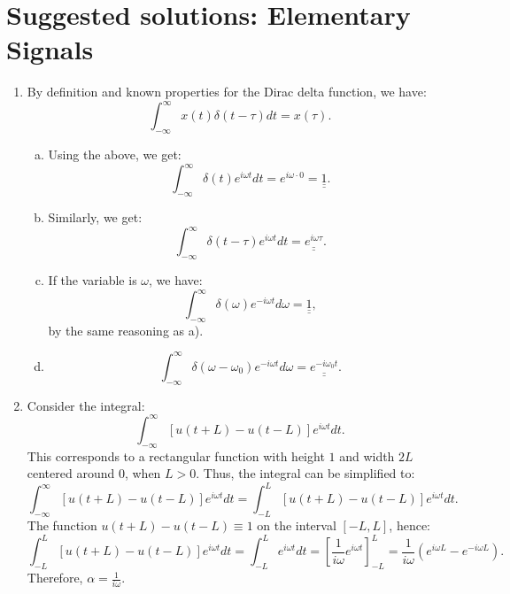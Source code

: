 
\newpage
\section{Suggested solutions: Elementary Signals}

\begin{enumerate}
  \item By definition and known properties for the Dirac delta function, we have:
        \[ \int_{-\infty}^{\infty}x(t)\delta(t-\tau)dt=x(\tau). \]

        \begin{enumerate}[a)]

          \item Using the above, we get:
                \[ \int_{-\infty}^{\infty}\delta(t)e^{i\omega t}dt=e^{i\omega\cdot 0}=\underline{\underline{1}}. \]

          \item Similarly, we get:
                \[ \int_{-\infty}^{\infty}\delta(t-\tau)e^{i\omega t}dt=\underline{\underline{e^{i\omega\tau}}}. \]

          \item If the variable is $\omega$, we have:
                \[ \int_{-\infty}^{\infty}\delta(\omega)e^{-i\omega t}d\omega=\underline{\underline{1}}, \]
                by the same reasoning as a).

          \item \[ \int_{-\infty}^{\infty}\delta(\omega-\omega_{0})e^{-i\omega t}d\omega=\underline{\underline{e^{-i\omega_{0}t}}}. \]
        \end{enumerate}

  \item Consider the integral:
        \[ \int_{-\infty}^{\infty}[u(t+L)-u(t-L)]e^{i\omega t}dt. \]
        This corresponds to a rectangular function with height $1$ and width $2L$ centered around $0$, when $L>0$. Thus, the integral can be simplified to:
        \[ \int_{-\infty}^{\infty}[u(t+L)-u(t-L)]e^{i\omega t}dt=\int_{-L}^{L}[u(t+L)-u(t-L)]e^{i\omega t}dt. \]
        The function $u(t+L)-u(t-L)\equiv 1$ on the interval $[-L, L]$, hence:
        \[ \int_{-L}^{L}[u(t+L)-u(t-L)]e^{i\omega t}dt=\int_{-L}^{L}e^{i\omega t}dt=\left[\frac{1}{i\omega}e^{i\omega t}\right]_{-L}^{L}=\frac{1}{i\omega}(e^{i\omega L}-e^{-i\omega L}). \]
        Therefore, $\alpha=\frac{1}{i\omega}$.


\end{enumerate}
